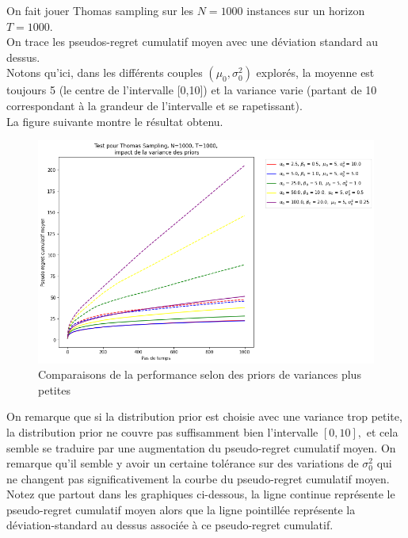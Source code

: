 \documentclass[letterpaper,11pt]{article}
\begin{document}
On fait jouer Thomas sampling sur les $N=1000$ instances sur un horizon $T=1000.$\\
 
On trace les pseudos-regret cumulatif moyen avec une déviation standard au dessus.\\

Notons qu'ici, dans les différents couples $(\mu_0,\sigma^2_0)$ explorés, la moyenne est toujours 5 (le centre de l'intervalle [0,10]) et la variance varie (partant de 10 correspondant à la grandeur de l'intervalle et se rapetissant).\\

La figure suivante montre le résultat obtenu.

\begin{figure}[H]
\label{figure: variance petite}
\caption{Comparaisons de la performance selon des priors de variances plus petites}
\begin{center}
\includegraphics[scale=0.5]{etude_variance_petite.png} 
\end{center}
\end{figure}

On remarque que si la distribution prior est choisie avec une variance trop petite, la distribution prior ne couvre pas suffisamment bien l'intervalle $[0,10],$ et cela semble se traduire par une augmentation du pseudo-regret cumulatif moyen. On remarque qu'il semble y avoir un certaine tolérance sur des variations de $\sigma^2_0$ qui ne changent pas significativement la courbe du pseudo-regret cumulatif moyen. \\

Notez que partout dans les graphiques ci-dessous, la ligne continue représente le pseudo-regret cumulatif moyen alors que la ligne pointillée représente la déviation-standard au dessus associée à ce pseudo-regret cumulatif.
\end{document}
